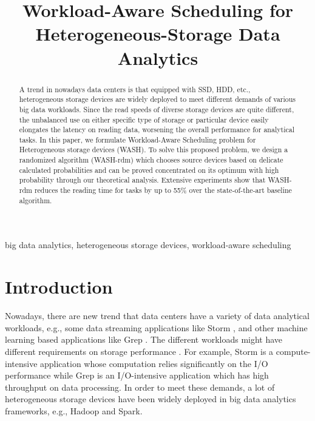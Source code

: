 \documentclass[conference]{IEEEtran}
\begin{document}
\title{Workload-Aware Scheduling for Heterogeneous-Storage Data Analytics\\
}

\author{
}


\maketitle
\begin{abstract}
A trend in nowadays data centers is that equipped with SSD, HDD, etc., heterogeneous storage devices are widely deployed to meet different demands of various big data workloads. Since the read speeds of diverse storage devices are quite different, the unbalanced use on either specific type of storage or particular device easily elongates the latency on reading data, worsening the overall performance for analytical tasks. In this paper, we formulate Workload-Aware Scheduling problem for Heterogeneous storage devices (WASH). To solve this proposed problem, we design a randomized algorithm (WASH-rdm) which chooses source devices based on delicate calculated probabilities and can be proved concentrated on its optimum with high probability through our theoretical analysis. Extensive experiments show that WASH-rdm reduces the reading time for tasks by up to 55\% over the state-of-the-art baseline algorithm.

\end{abstract}

\begin{IEEEkeywords}
big data analytics, heterogeneous storage devices, workload-aware scheduling
\end{IEEEkeywords}

\section{Introduction}

Nowadays, there are new trend that data centers have a variety of data analytical workloads, e.g., some data streaming applications like Storm
\cite{b40}, and other machine learning based applications like Grep \cite{b27}. The different workloads might have different requirements on storage performance \cite{b28} \cite{b29} \cite{b30} \cite{b31}. For example, Storm is a compute-intensive application whose computation relies significantly on the I/O performance while Grep is an I/O-intensive application which has high throughput on data processing. In order to meet these demands, a lot of heterogeneous storage devices \cite{b6} have been widely deployed in big data analytics frameworks, e.g., Hadoop \cite{b14} and Spark\cite{b15}.
\end{document}
